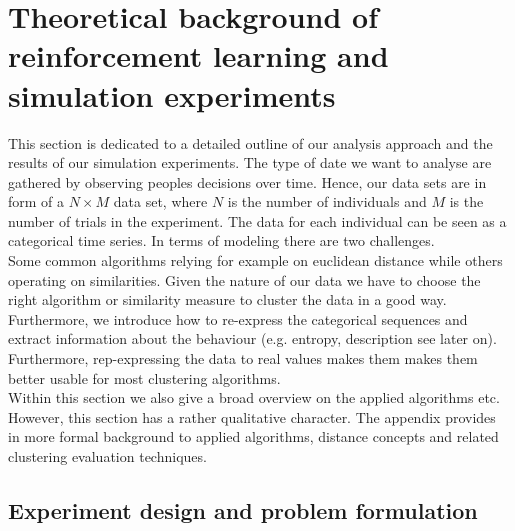 \documentclass[12pt,a4paper,bibliography=totocnumbered,listof=totocnumbered]{scrartcl}
\begin{document}

\section{Theoretical background of reinforcement learning and simulation experiments}

This section is dedicated to a detailed outline of our analysis approach and the results of our simulation experiments. The type of date we want to analyse are gathered by observing peoples decisions over time. Hence, our data sets are in form of a $N \times M$ data set, where $N$ is the number of individuals and $M$ is the number of trials in the experiment. The data for each individual can be seen as a categorical time series. In terms of modeling there are two challenges.\\
Some common algorithms relying for example on euclidean distance while others operating on similarities. Given the nature of our data we have to choose the right algorithm or similarity measure to cluster the data in a good way. \\
Furthermore, we introduce how to re-express the categorical sequences and extract information about the behaviour (e.g. entropy, description see later on). Furthermore, rep-expressing the data to real values makes them makes them better usable for most clustering algorithms.\\
Within this section we also give a broad overview on the applied algorithms etc. However, this section has a rather qualitative character. The appendix provides in more formal background to applied algorithms, distance concepts and related clustering evaluation techniques. 

\subsection{Experiment design and problem formulation}
\end{document}
